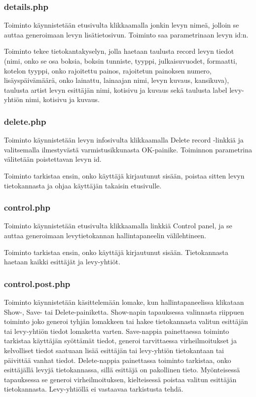 \documentclass[a4paper,12pt]{report}
\begin{document}
\subsubsection{details.php}

Toiminto käynnistetään etusivulta klikkaamalla jonkin levyn nimeä, jolloin
se auttaa generoimaan levyn lisätietosivun.  Toiminto saa parametrinaan
levyn id:n.

Toiminto tekee tietokantakyselyn, jolla haetaan taulusta record levyn tiedot
(nimi, onko se osa boksia, boksin tunniste, tyyppi, julkaisuvuodet,
formaatti, kotelon tyyppi, onko rajoitettu painos, rajoitetun painoksen
numero, lisäyspäivämäärä, onko lainattu, lainaajan nimi, levyn kuvaus,
kansikuva), taulusta artist levyn esittäjän nimi, kotisivu ja kuvaus sekä
taulusta label levy-yhtiön nimi, kotisivu ja kuvaus.

\subsubsection{delete.php}

Toiminto käynnistetään levyn infosivulta klikkaamalla Delete record -linkkiä
ja valitsemalla ilmestyvästä varmistusikkunasta OK-painike. Toiminnon
parametrina välitetään poistettavan levyn id.

Toiminto tarkistaa ensin, onko käyttäjä kirjautunut sisään, poistaa sitten
levyn tietokannasta ja ohjaa käyttäjän takaisin etusivulle.

\subsubsection{control.php}

Toiminto käynnistetään etusivulta klikkaamalla linkkiä Control panel, ja se
auttaa generoimaan levytietokannan hallintapaneelin välilehtineen.

Toiminto tarkistaa ensin, onko käyttäjä kirjautunut sisään. Tietokannasta
haetaan kaikki esittäjät ja levy-yhtiöt.

\subsubsection{control.post.php}

Toiminto käynnistetään käsittelemään lomake, kun hallintapaneelissa
klikataan Show-, Save- tai Delete-painiketta.  Show-napin tapauksessa
valinnasta riippuen toiminto joko generoi tyhjän lomakkeen tai hakee
tietokannasta valitun esittäjän tai levy-yhtiön tiedot lomaketta varten.
Save-nappia painettaessa toiminto tarkistaa käyttäjän syöttämät tiedot,
generoi tarvittaessa virheilmoitukset ja kelvolliset tiedot saatuaan lisää
esittäjän tai levy-yhtiön tietokantaan tai päivittää vanhat tiedot.
Delete-nappia painettassa toiminto tarkistaa, onko esittäjällä levyjä
tietokannassa, sillä esittäjä on pakollinen tieto. Myönteisessä tapauksessa
se generoi virheilmoituksen, kielteisessä poistaa valitun esittäjän
tietokannasta. Levy-yhtiöllä ei vastaavaa tarkistusta tehdä.
\end{document}
